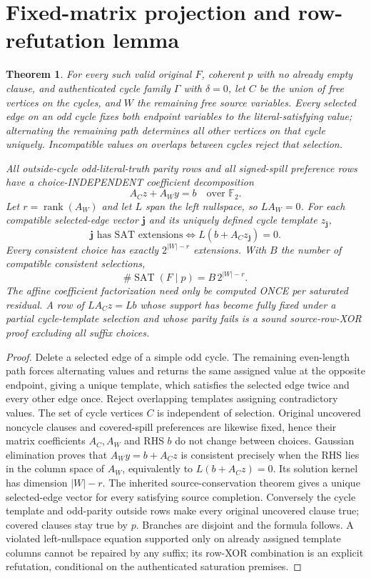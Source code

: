 \documentclass[11pt]{article}
\newtheorem{theorem}{Theorem}
\begin{document}
\section{Fixed-matrix projection and row-refutation lemma}
\begin{theorem}
For every such valid original $F$, coherent $p$ with no already empty clause, and authenticated cycle family $\Gamma$ with $\delta=0$, let $C$ be the union of free vertices on the cycles, and $W$ the remaining free source variables. Every selected edge on an odd cycle fixes both endpoint variables to the literal-satisfying value; alternating the remaining path determines all other vertices on that cycle uniquely. Incompatible values on overlaps between cycles reject that selection.

All outside-cycle odd-literal-truth parity rows and all signed-spill preference rows have a choice-INDEPENDENT coefficient decomposition
\[
A_Cz+A_Wy=b\quad\text{over }\mathbb F_2.
\]
Let $r=\operatorname{rank}(A_W)$ and let $L$ span the left nullspace, so $LA_W=0$. For each compatible selected-edge vector $\mathbf j$ and its uniquely defined cycle template $z_{\mathbf j}$,
\[
\mathbf j\text{ has SAT extensions}\iff L(b+A_Cz_{\mathbf j})=0.
\]
Every consistent choice has exactly $2^{|W|-r}$ extensions. With $B$ the number of compatible consistent selections,
\[
\boxed{\#\operatorname{SAT}(F\mid p)=B\,2^{|W|-r}.}
\]
The affine coefficient factorization need only be computed ONCE per saturated residual. A row of $LA_Cz=Lb$ whose support has become fully fixed under a partial cycle-template selection and whose parity fails is a sound source-row-XOR proof excluding \emph{all} suffix choices.
\end{theorem}
\begin{proof}
Delete a selected edge of a simple odd cycle. The remaining even-length path forces alternating values and returns the same assigned value at the opposite endpoint, giving a unique template, which satisfies the selected edge twice and every other edge once. Reject overlapping templates assigning contradictory values. The set of cycle vertices $C$ is independent of selection. Original uncovered noncycle clauses and covered-spill preferences are likewise fixed, hence their matrix coefficients $A_C,A_W$ and RHS $b$ do not change between choices. Gaussian elimination proves that $A_Wy=b+A_Cz$ is consistent precisely when the RHS lies in the column space of $A_W$, equivalently to $L(b+A_Cz)=0$. Its solution kernel has dimension $|W|-r$. The inherited source-conservation theorem gives a unique selected-edge vector for every satisfying source completion. Conversely the cycle template and odd-parity outside rows make every original uncovered clause true; covered clauses stay true by $p$. Branches are disjoint and the formula follows. A violated left-nullspace equation supported only on already assigned template columns cannot be repaired by any suffix; its row-XOR combination is an explicit refutation, conditional on the authenticated saturation premises.
\end{proof}
\end{document}
